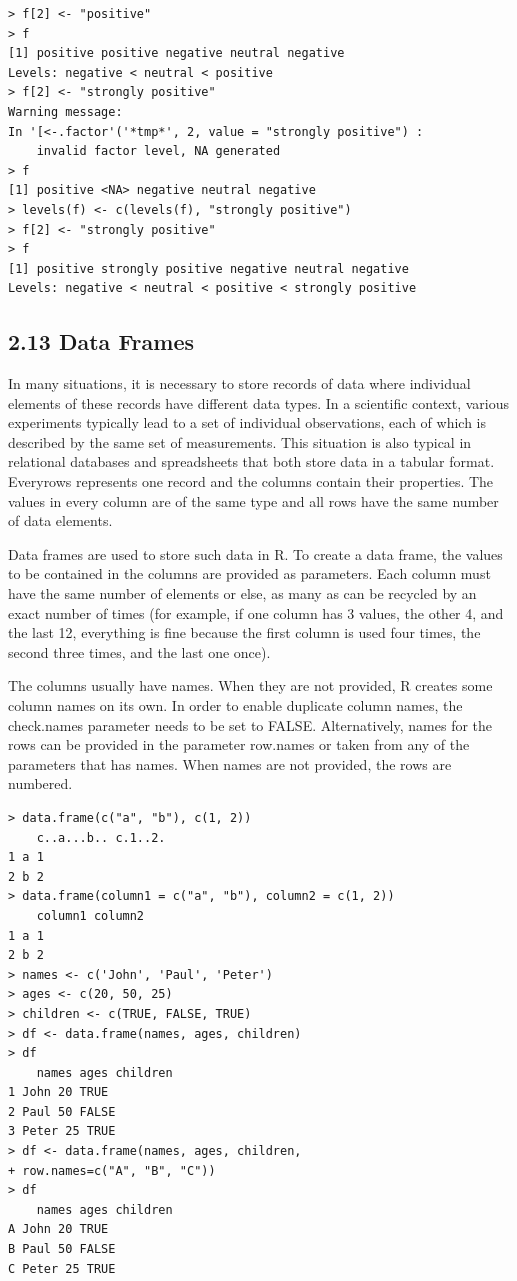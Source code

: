 \documentclass[10pt]{book}
\begin{document}
\begin{verbatim}
> f[2] <- "positive"
> f
[1] positive positive negative neutral negative
Levels: negative < neutral < positive
> f[2] <- "strongly positive"
Warning message:
In '[<-.factor'('*tmp*', 2, value = "strongly positive") :
    invalid factor level, NA generated
> f
[1] positive <NA> negative neutral negative
> levels(f) <- c(levels(f), "strongly positive")
> f[2] <- "strongly positive"
> f
[1] positive strongly positive negative neutral negative
Levels: negative < neutral < positive < strongly positive
\end{verbatim}

\subsection*{2.13 Data Frames}
In many situations, it is necessary to store records of data where individual elements of these records have different data types. In a scientific context, various experiments typically lead to a set of individual observations, each of which is described by the same set of measurements. This situation is also typical in relational databases and spreadsheets that both store data in a tabular format. Everyrows represents one record and the columns contain their properties. The values in every column are of the same type and all rows have the same number of data elements.

Data frames are used to store such data in R. To create a data frame, the values to be contained in the columns are provided as parameters. Each column must have the same number of elements or else, as many as can be recycled by an exact number of times (for example, if one column has 3 values, the other 4, and the last 12, everything is fine because the first column is used four times, the second three times, and the last one once).

The columns usually have names. When they are not provided, R creates some column names on its own. In order to enable duplicate column names, the check.names parameter needs to be set to FALSE. Alternatively, names for the rows can be provided in the parameter row.names or taken from any of the parameters that has names. When names are not provided, the rows are numbered.

\begin{verbatim}
> data.frame(c("a", "b"), c(1, 2))
    c..a...b.. c.1..2.
1 a 1
2 b 2
> data.frame(column1 = c("a", "b"), column2 = c(1, 2))
    column1 column2
1 a 1
2 b 2
> names <- c('John', 'Paul', 'Peter')
> ages <- c(20, 50, 25)
> children <- c(TRUE, FALSE, TRUE)
> df <- data.frame(names, ages, children)
> df
    names ages children
1 John 20 TRUE
2 Paul 50 FALSE
3 Peter 25 TRUE
> df <- data.frame(names, ages, children,
+ row.names=c("A", "B", "C"))
> df
    names ages children
A John 20 TRUE
B Paul 50 FALSE
C Peter 25 TRUE
\end{verbatim}
\end{document}

